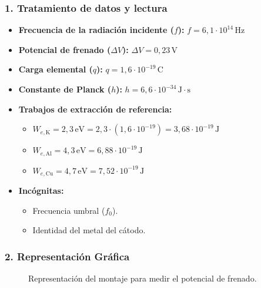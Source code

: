 \subsubsection*{1. Tratamiento de datos y lectura}
\begin{itemize}
    \item \textbf{Frecuencia de la radiación incidente ($f$):} $f = 6,1 \cdot 10^{14} \, \text{Hz}$
    \item \textbf{Potencial de frenado ($\Delta V$):} $\Delta V = 0,23 \, \text{V}$
    \item \textbf{Carga elemental ($q$):} $q = 1,6 \cdot 10^{-19} \, \text{C}$
    \item \textbf{Constante de Planck ($h$):} $h = 6,6 \cdot 10^{-34} \, \text{J}\cdot\text{s}$
    \item \textbf{Trabajos de extracción de referencia:}
    \begin{itemize}
        \item $W_{e,\text{K}} = 2,3 \, \text{eV} = 2,3 \cdot (1,6 \cdot 10^{-19}) = 3,68 \cdot 10^{-19} \, \text{J}$
        \item $W_{e,\text{Al}} = 4,3 \, \text{eV} = 6,88 \cdot 10^{-19} \, \text{J}$
        \item $W_{e,\text{Cu}} = 4,7 \, \text{eV} = 7,52 \cdot 10^{-19} \, \text{J}$
    \end{itemize}
    \item \textbf{Incógnitas:}
    \begin{itemize}
        \item Frecuencia umbral ($f_0$).
        \item Identidad del metal del cátodo.
    \end{itemize}
\end{itemize}

\subsubsection*{2. Representación Gráfica}
\begin{figure}[H]
    \centering
    \caption{Representación del montaje para medir el potencial de frenado.}
\end{figure}

